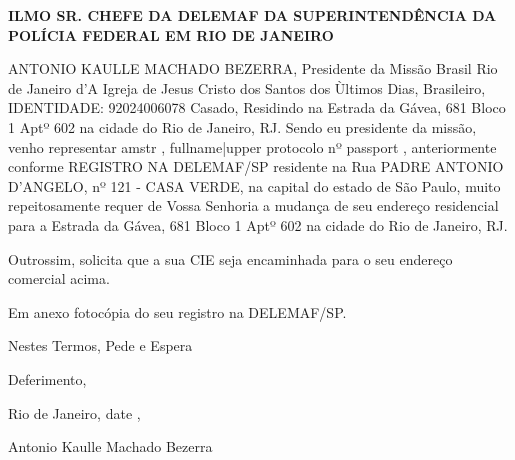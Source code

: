\documentclass[12pt]{article}
\begin{document}
\vspace{3cm}

\noindent
\textbf{ILMO SR. CHEFE DA DELEMAF DA SUPERINTENDÊNCIA DA POLÍCIA FEDERAL EM RIO DE JANEIRO}

\vspace{2cm}

ANTONIO KAULLE MACHADO BEZERRA, Presidente da Missão Brasil Rio de Janeiro d'A Igreja de Jesus Cristo dos Santos dos Ùltimos Dias, Brasileiro, IDENTIDADE: 92024006078  Casado, Residindo na Estrada da Gávea, 681 Bloco 1 Aptº 602 na cidade do Rio de Janeiro, RJ. Sendo eu presidente da missão, venho representar {{ amstr }}, {{ fullname|upper }} protocolo nº {{ passport }}, anteriormente conforme REGISTRO NA DELEMAF/SP residente na Rua PADRE ANTONIO D'ANGELO, nº 121 - CASA VERDE, na capital do estado de São Paulo, muito repeitosamente requer de Vossa Senhoria a mudança de seu endereço residencial para a Estrada da Gávea, 681 Bloco 1 Aptº 602 na cidade do Rio de Janeiro, RJ.

Outrossim, solicita que a sua CIE seja encaminhada para o seu endereço comercial acima.

Em anexo fotocópia do seu registro na DELEMAF/SP.

\vspace{1cm}

\hspace{4cm}Nestes Termos, Pede e Espera

\hspace{4cm}Deferimento,

\hspace{4cm}Rio de Janeiro, {{ date }},

\vspace{2cm}

\hspace{4cm}\makebox[8cm]{\hrulefill}

\hspace{4cm}Antonio Kaulle Machado Bezerra
\end{document}
